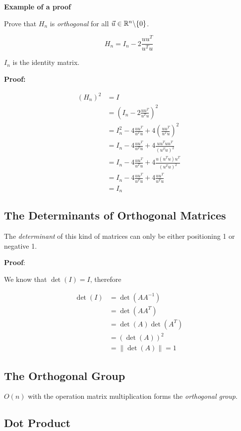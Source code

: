 \textbf{Example of a proof}

Prove that \(H_n\) is \emph{orthogonal} for all \(\vec{u}\in \mathbb{R}^n \backslash \{0\} \).

\[
    H_n = I_n - 2 \frac{uu^T}{u^Tu}
\]

\(I_n\) is the identity matrix.

\textbf{Proof:}

\begin{align*}
    (H_n)^2 &= I \\
    &= \left(I_n - 2 \frac{uu^T}{u^Tu}\right)^2\\
    &= I_n^2 - 4\frac{uu^T}{u^Tu} + 4\left(\frac{uu^T}{u^Tu}\right)^2\\
    &= I_n -4\frac{uu^T}{u^Tu} +4\frac{uu^T uu^T}{(u^Tu)^2}\\ 
    &= I_n -4\frac{uu^T}{u^Tu} +4\frac{u(u^T u)u^T}{(u^Tu)^2}\\ 
    &= I_n -4\frac{uu^T}{u^Tu} +4\frac{uu^T}{u^Tu}\\ 
    &= I_n
\end{align*}

\QED

\subsection{The Determinants of Orthogonal Matrices}

The \emph{determinant} of this kind of matrices can only be either positioning 1 or negative 1.

\textbf{Proof}:

We know that \(\det(I) = I \), therefore

\begin{align*}
    \det(I) &= \det(A A^{-1}) \\
            &= \det(A A^T) \\
            &= \det(A) \det(A^T) \\
            &= (\det(A))^2 \\
            &= \|\det (A) \| = 1
\end{align*}

\QED

\subsection{The Orthogonal Group}

\(O(n)\) with the operation matrix multiplication forms the \emph{orthogonal group}.

\subsection{Dot Product}

